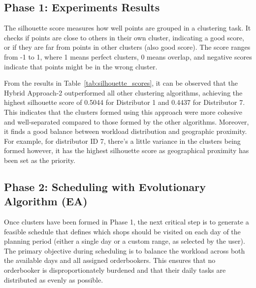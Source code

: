 \subsection{Phase 1: Experiments Results}
The silhouette score measures how well points are grouped in a clustering task. It checks if points are close to others in their own cluster, indicating a good score, or if they are far from points in other clusters (also good score). The score ranges from -1 to 1, where 1 means perfect clusters, 0 means overlap, and negative scores indicate that points might be in the wrong cluster.

\begin{table}[H]
    \centering
    \caption{Silhouette Score Comparison for Different Clustering Algorithms}
    \label{tab:silhouette_scores}
    \end{table}

From the results in Table~\ref{tab:silhouette_scores}, it can be observed that the Hybrid Approach-2 outperformed all other clustering algorithms, achieving the highest silhouette score of 0.5044 for Distributor 1 and 0.4437 for Distributor 7. This indicates that the clusters formed using this approach were more cohesive and well-separated compared to those formed by the other algorithms.
Moreover, it finds a good balance between workload distribution and geographic proximity. For example, for distributor ID 7, there's a little variance in the clusters being formed however, it has the highest silhouette score as geographical proximity has been set as the priority.



\subsection{Phase 2: Scheduling with Evolutionary Algorithm (EA)} %
Once clusters have been formed in Phase 1, the next critical step is to generate a feasible schedule that defines which shops should be visited on each day of the planning period (either a single day or a custom range, as selected by the user). The primary objective during scheduling is to balance the workload across both the available days and all assigned orderbookers. This ensures that no orderbooker is disproportionately burdened and that their daily tasks are distributed as evenly as possible.

